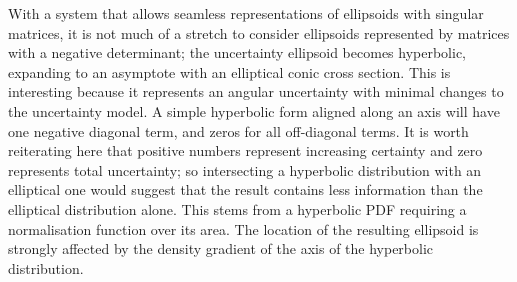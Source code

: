 \documentclass{article}
\newcounter{subsubsubsection}[subsubsection]
\begin{document}
        \label{sec:hyperbolicCase}
        With a system that allows seamless representations of ellipsoids with singular matrices, it is not much of a stretch to consider ellipsoids represented by matrices with a negative determinant; the uncertainty ellipsoid becomes hyperbolic, expanding to an asymptote with an elliptical conic cross section.  This is interesting because it represents an angular uncertainty with minimal changes to the uncertainty model.
        A simple hyperbolic form aligned along an axis will have one negative diagonal term, and zeros for all off-diagonal terms.
        It is worth reiterating here that positive numbers represent increasing certainty and zero represents total uncertainty; so intersecting a hyperbolic distribution with an elliptical one would suggest that the result contains less information than the elliptical distribution alone.
        This stems from a hyperbolic PDF requiring a normalisation function over its area.  The location of the resulting ellipsoid is strongly affected by the density gradient of the axis of the hyperbolic distribution.
\end{document}
